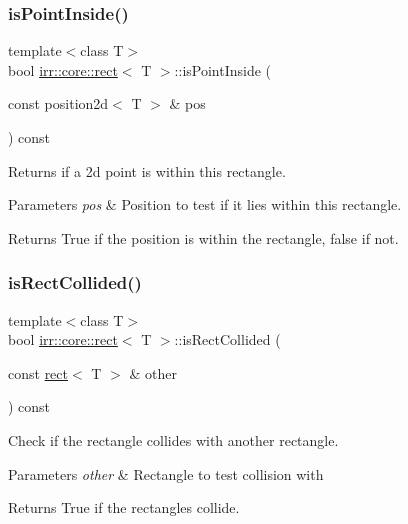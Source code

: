 \subsubsection{\texorpdfstring{is\+Point\+Inside()}{isPointInside()}}
{\footnotesize\ttfamily template$<$class T$>$ \\
bool \hyperlink{classirr_1_1core_1_1rect}{irr\+::core\+::rect}$<$ T $>$\+::is\+Point\+Inside (\begin{DoxyParamCaption}\item[{const position2d$<$ T $>$ \&}]{pos }\end{DoxyParamCaption}) const\hspace{0.3cm}{\ttfamily [inline]}}



Returns if a 2d point is within this rectangle. 


\begin{DoxyParams}{Parameters}
{\em pos} & Position to test if it lies within this rectangle. \\
\hline
\end{DoxyParams}
\begin{DoxyReturn}{Returns}
True if the position is within the rectangle, false if not. 
\end{DoxyReturn}
\mbox{\label{classirr_1_1core_1_1rect_ab94b7d9da434c7b08761426e296c2f3e}} 
\subsubsection{\texorpdfstring{is\+Rect\+Collided()}{isRectCollided()}}
{\footnotesize\ttfamily template$<$class T$>$ \\
bool \hyperlink{classirr_1_1core_1_1rect}{irr\+::core\+::rect}$<$ T $>$\+::is\+Rect\+Collided (\begin{DoxyParamCaption}\item[{const \hyperlink{classirr_1_1core_1_1rect}{rect}$<$ T $>$ \&}]{other }\end{DoxyParamCaption}) const\hspace{0.3cm}{\ttfamily [inline]}}



Check if the rectangle collides with another rectangle. 


\begin{DoxyParams}{Parameters}
{\em other} & Rectangle to test collision with \\
\hline
\end{DoxyParams}
\begin{DoxyReturn}{Returns}
True if the rectangles collide. 
\end{DoxyReturn}
\mbox{\label{classirr_1_1core_1_1rect_ad2f5052c13cffb08f6ce8649296ec9df}} 
